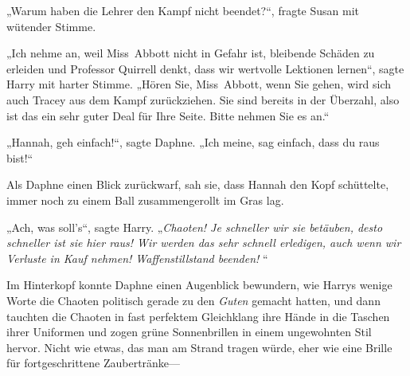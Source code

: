 „Warum haben die Lehrer den Kampf nicht beendet?“, fragte Susan mit wütender Stimme.

„Ich nehme an, weil Miss~Abbott nicht in Gefahr ist, bleibende Schäden zu erleiden und Professor Quirrell denkt, dass wir wertvolle Lektionen lernen“, sagte Harry mit harter Stimme. „Hören Sie, Miss~Abbott, wenn Sie gehen, wird sich auch Tracey aus dem Kampf zurückziehen. Sie sind bereits in der Überzahl, also ist das ein sehr guter Deal für Ihre Seite. Bitte nehmen Sie es an.“

„Hannah, geh einfach!“, sagte Daphne. „Ich meine, sag einfach, dass du raus bist!“

Als Daphne einen Blick zurückwarf, sah sie, dass Hannah den Kopf schüttelte, immer noch zu einem Ball zusammengerollt im Gras lag.

„Ach, was soll’s“, sagte Harry. „\emph{Chaoten! Je schneller wir sie betäuben, desto schneller ist sie hier raus! Wir werden das sehr schnell erledigen, auch wenn wir Verluste in Kauf nehmen! Waffenstillstand beenden! }“

Im Hinterkopf konnte Daphne einen Augenblick bewundern, wie Harrys wenige Worte die Chaoten politisch gerade zu den \emph{Guten} gemacht hatten, und dann tauchten die Chaoten in fast perfektem Gleichklang ihre Hände in die Taschen ihrer Uniformen und zogen grüne Sonnenbrillen in einem ungewohnten Stil hervor. Nicht wie etwas, das man am Strand tragen würde, eher wie eine Brille für fortgeschrittene Zaubertränke—

